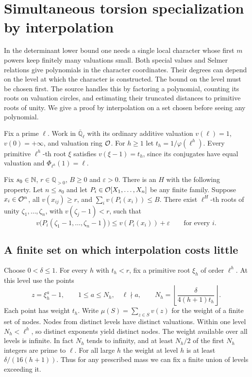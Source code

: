 \section{Simultaneous torsion specialization by interpolation}
\label{sec:torsion}
In the determinant lower bound one needs a single local character whose first $m$ powers keep finitely many valuations small. Both special values and Selmer relations give polynomials in the character coordinates. Their degrees can depend on the level at which the character is constructed. The bound on the level must be chosen first. The source handles this by factoring a polynomial, counting its roots on valuation circles, and estimating their truncated distances to primitive roots of unity. We give a proof by interpolation on a set chosen before seeing any polynomial.

Fix a prime $\ell$. Work in $\overline{\mathbb Q}_\ell$ with its ordinary additive valuation $v(\ell)=1$, $v(0)=+\infty$, and valuation ring $\mathcal O$. For $h\ge1$ let $t_h=1/\varphi(\ell^h)$. Every primitive $\ell^h$-th root $\xi$ satisfies $v(\xi-1)=t_h$, since its conjugates have equal valuation and $\Phi_{\ell^h}(1)=\ell$.

\begin{theorem}\label{thm:torsion}
Fix $s_0\in\mathbb N$, $r\in\mathbb Q_{>0}$, $B\ge0$ and $\varepsilon>0$. There is an $H$ with the following property. Let $n\le s_0$ and let $P_i\in\mathcal O[X_1,\ldots,X_n]$ be any finite family. Suppose $x_i\in\mathcal O^n$, all $v(x_{ij})\ge r$, and $\sum_i v(P_i(x_i))\le B$. There exist $\ell^H$-th roots of unity $\zeta_1,\ldots,\zeta_n$, with $v(\zeta_j-1)<r$, such that
\[
 v\bigl(P_i(\zeta_1-1,\ldots,\zeta_n-1)\bigr)
                         \le v(P_i(x_i))+\varepsilon\qquad\text{for every }i .
\]
\end{theorem}

\subsection*{A finite set on which interpolation costs little}
Choose $0<\delta\le1$. For every $h$ with $t_h<r$, fix a primitive root $\xi_h$ of order $\ell^h$. At this level use the points
\[
 z=\xi_h^{a}-1,\qquad 1\le a\le N_h,\quad \ell\nmid a,
 \qquad N_h=\left\lfloor\frac{\delta}{4(h+1)t_h}\right\rfloor.
\]
Each point has weight $t_h$. Write $\mu(S)=\sum_{z\in S}v(z)$ for the weight of a finite set of nodes. Nodes from distinct levels have distinct valuations. Within one level $N_h<\ell^h$, so distinct exponents yield distinct nodes. The weight available over all levels is infinite. In fact $N_h$ tends to infinity, and at least $N_h/2$ of the first $N_h$ integers are prime to $\ell$. For all large $h$ the weight at level $h$ is at least $\delta/(16(h+1))$. Thus for any prescribed mass we can fix a finite union of levels exceeding it.

